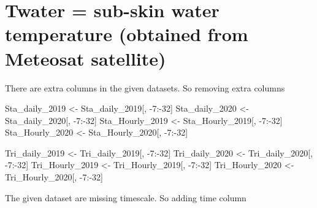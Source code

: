 \documentclass[
]{article}
\newenvironment{Shaded}{\begin{snugshade}}{\end{snugshade}}
\newcommand{\DecValTok}[1]{\textcolor[rgb]{0.00,0.00,0.81}{#1}}
\newcommand{\NormalTok}[1]{#1}
\newcommand{\OtherTok}[1]{\textcolor[rgb]{0.56,0.35,0.01}{#1}}
\newcommand{\SpecialCharTok}[1]{\textcolor[rgb]{0.00,0.00,0.00}{#1}}
\begin{document}
\hypertarget{twater-sub-skin-water-temperature-obtained-from-meteosat-satellite}{%
\section{Twater = sub-skin water temperature (obtained from Meteosat
satellite)}\label{twater-sub-skin-water-temperature-obtained-from-meteosat-satellite}}

There are extra columns in the given datasets. So removing extra columns

\begin{Shaded}
\begin{Highlighting}[]
\NormalTok{Sta\_daily\_2019 }\OtherTok{\textless{}{-}}\NormalTok{ Sta\_daily\_2019[, }\SpecialCharTok{{-}}\DecValTok{7}\SpecialCharTok{:{-}}\DecValTok{32}\NormalTok{]}
\NormalTok{Sta\_daily\_2020 }\OtherTok{\textless{}{-}}\NormalTok{ Sta\_daily\_2020[, }\SpecialCharTok{{-}}\DecValTok{7}\SpecialCharTok{:{-}}\DecValTok{32}\NormalTok{]}
\NormalTok{Sta\_Hourly\_2019 }\OtherTok{\textless{}{-}}\NormalTok{ Sta\_Hourly\_2019[, }\SpecialCharTok{{-}}\DecValTok{7}\SpecialCharTok{:{-}}\DecValTok{32}\NormalTok{]}
\NormalTok{Sta\_Hourly\_2020 }\OtherTok{\textless{}{-}}\NormalTok{ Sta\_Hourly\_2020[, }\SpecialCharTok{{-}}\DecValTok{7}\SpecialCharTok{:{-}}\DecValTok{32}\NormalTok{]}

\NormalTok{Tri\_daily\_2019 }\OtherTok{\textless{}{-}}\NormalTok{ Tri\_daily\_2019[, }\SpecialCharTok{{-}}\DecValTok{7}\SpecialCharTok{:{-}}\DecValTok{32}\NormalTok{]}
\NormalTok{Tri\_daily\_2020 }\OtherTok{\textless{}{-}}\NormalTok{ Tri\_daily\_2020[, }\SpecialCharTok{{-}}\DecValTok{7}\SpecialCharTok{:{-}}\DecValTok{32}\NormalTok{]}
\NormalTok{Tri\_Hourly\_2019 }\OtherTok{\textless{}{-}}\NormalTok{ Tri\_Hourly\_2019[, }\SpecialCharTok{{-}}\DecValTok{7}\SpecialCharTok{:{-}}\DecValTok{32}\NormalTok{]}
\NormalTok{Tri\_Hourly\_2020 }\OtherTok{\textless{}{-}}\NormalTok{ Tri\_Hourly\_2020[, }\SpecialCharTok{{-}}\DecValTok{7}\SpecialCharTok{:{-}}\DecValTok{32}\NormalTok{]}
\end{Highlighting}
\end{Shaded}

The given dataset are missing timescale. So adding time column
\end{document}

